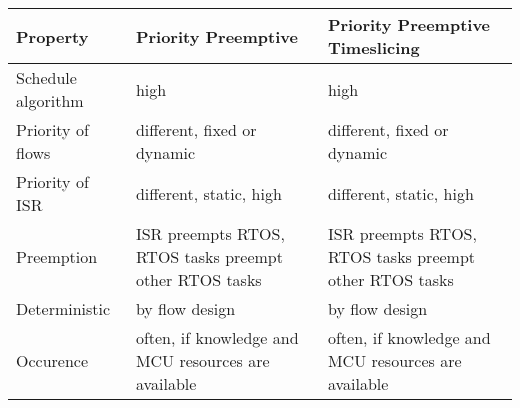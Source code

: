 \begin{sidewaystable}
  \begin{tabularx}{\textwidth}{l X X}
    \hline
    Property           & Priority Preemptive                                    & Priority Preemptive Timeslicing                        \\\hline
    Schedule algorithm & high                                                   & high                                                   \\
    Priority of flows  & different, fixed or dynamic                            & different, fixed or dynamic                            \\
    Priority of ISR    & different, static, high                                & different, static, high                                \\
    Preemption         & ISR preempts RTOS, RTOS tasks preempt other RTOS tasks & ISR preempts RTOS, RTOS tasks preempt other RTOS tasks \\
    Deterministic      & by flow design                                         & by flow design                                         \\
    Occurence          & often, if knowledge and MCU resources are available    & often, if knowledge and MCU resources are available    \\\hline
  \end{tabularx}
\end{sidewaystable}